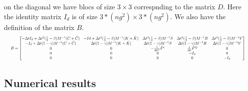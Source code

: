 on the diagonal we have blocs of size  $3 \times 3$ correspnding to the matrix $D$. Here the identity matrix $I_d$ is of size $3*(ng^2) \times 3*(ng^2)$.
We also have the definition of the matrix $B$.
\begin{equation}
\resizebox{\columnwidth}{!}{
$
B = \begin{bmatrix}
 - \Delta t I_d + \Delta t^2 (\frac{1}{2} - \beta) M^{-1} (C+\tilde{C}) & - Id + \Delta t^2 (\frac{1}{2} - \beta) M^{-1}(K+\tilde{K}) & \Delta t^2 (\frac{1}{2} - \beta) M^{-1} S & \Delta t^2 (\frac{1}{2} - \beta) M^{-1} R & \Delta t^2 (\frac{1}{2} - \beta) M^{-1} V \\
-I_d + \Delta t (1-\gamma) M^{-1} (C+\tilde{C})& \Delta t (1-\gamma) M^{-1} (K+\tilde{K}) & \Delta t (1-\gamma) M^{-1} S& \Delta t (1-\gamma) M^{-1} R & \Delta t (1-\gamma) M^{-1} V \\
0 & 0 & -\frac{1}{\Delta t^2}\hat{F}^\epsilon & \frac{1}{\Delta t} \hat{F}^Q & 0 \\
0 & 0 & 0 & -I_d & 0 \\
0 & 0 & 0 & 0 & -I_d 
\end{bmatrix}
$
}
\label{eq:B}
\end{equation}


\subsection{Numerical results}